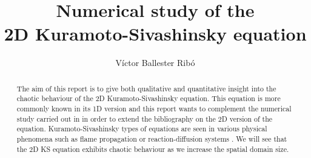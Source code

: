 \documentclass[twoside]{article}
\title{Numerical study of the\\2D Kuramoto-Sivashinsky equation}
\author{Víctor Ballester Ribó}
\date{\parbox{\linewidth}{\centering
Instabilities and Nonlinear Phenomena\endgraf
M2 - Applied and Theoretical Mathematics\endgraf
Université Paris-Dauphine, PSL\endgraf
\today}}
\begin{document}
\maketitle
\begin{abstract}
  The aim of this report is to give both qualitative and quantitative insight into the chaotic behaviour of the 2D Kuramoto-Sivashinsky equation. This equation is more commonly known in its 1D version and this report wants to complement the numerical study carried out in \cite{Kalogirou2015} in order to extend the bibliography on the 2D version of the equation. Kuramoto-Sivashinsky types of equations are seen in various physical phenomena such as flame propagation or reaction-diffusion systems \cite{Kuramoto,Sivashinsky1977}. We will see that the 2D KS equation exhibits chaotic behaviour as we increase the spatial domain size.
\end{abstract}
\end{document}
